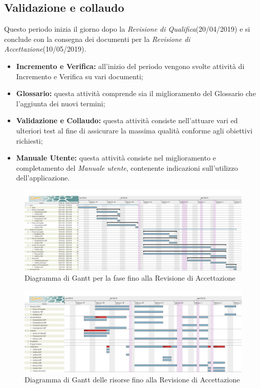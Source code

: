 \newpage
\subsection{Validazione e collaudo}
Questo periodo inizia il giorno dopo la  \textit{Revisione di Qualifica}(20/04/2019) e si conclude con la consegna dei documenti per la  \textit{Revisione di Accettazione}(10/05/2019). 
\begin{itemize}
	\item{\textbf{Incremento e Verifica:} all’inizio del periodo vengono svolte attività di Incremento e Verifica su vari documenti;}
	\item{\textbf{Glossario:} questa attività comprende sia il miglioramento del Glossario che l’aggiunta dei nuovi termini;}
	\item{\textbf{Validazione e Collaudo:} questa attività consiste nell'attuare vari ed ulteriori test al fine di assicurare la massima qualità conforme agli obiettivi richiesti;}
	\item{\textbf{Manuale Utente:} questa attività consiste nel miglioramento e completamento del \textit{Manuale utente}, contenente indicazioni sull’utilizzo dell’applicazione.}
\end{itemize}

\begin{figure}[h!]
	\centering
	\includegraphics[width=\textwidth]{Gantt_quarta_fase.jpg}
	\caption{Diagramma di Gantt per la fase fino alla Revisione di Accettazione}
\end{figure}

\begin{figure}[h!]
	\centering
	\includegraphics[width=\textwidth]{Gantt_quarta_fase_risorse.jpg}
	\caption{Diagramma di Gantt delle risorse fino alla Revisione di Accettazione}
\end{figure}

